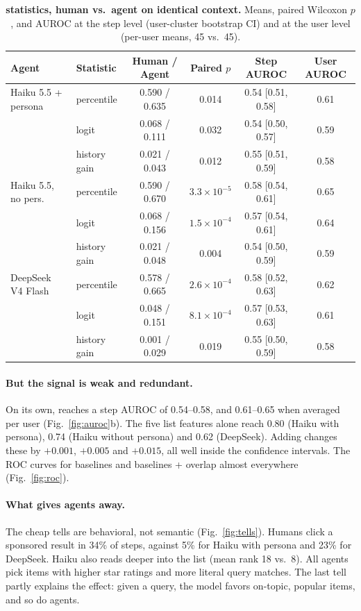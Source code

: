 \begin{table}[t]
\centering
\small
\caption{\textbf{\bgpt{} statistics, human vs.\ agent on identical context.} Means, paired Wilcoxon $p$, and AUROC at the step level (user-cluster bootstrap CI) and at the user level (per-user means, 45 vs.\ 45).}
\label{tab:main}
\setlength{\tabcolsep}{3.5pt}
\begin{tabular}{llcccc}
\toprule
Agent & Statistic & Human / Agent & Paired $p$ & Step AUROC & User AUROC \\
\midrule
Haiku 5.5 + persona & percentile & 0.590 / 0.635 & 0.014 & 0.54 [0.51, 0.58] & 0.61 \\
 & logit & 0.068 / 0.111 & 0.032 & 0.54 [0.50, 0.57] & 0.59 \\
 & history gain & 0.021 / 0.043 & 0.012 & 0.55 [0.51, 0.59] & 0.58 \\
\addlinespace
Haiku 5.5, no pers.\ & percentile & 0.590 / 0.670 & $3.3\times10^{-5}$ & 0.58 [0.54, 0.61] & 0.65 \\
 & logit & 0.068 / 0.156 & $1.5\times10^{-4}$ & 0.57 [0.54, 0.61] & 0.64 \\
 & history gain & 0.021 / 0.048 & 0.004 & 0.54 [0.50, 0.59] & 0.59 \\
\addlinespace
DeepSeek V4 Flash & percentile & 0.578 / 0.665 & $2.6\times10^{-4}$ & 0.58 [0.52, 0.63] & 0.62 \\
 & logit & 0.048 / 0.151 & $8.1\times10^{-4}$ & 0.57 [0.53, 0.63] & 0.61 \\
 & history gain & 0.001 / 0.029 & 0.019 & 0.55 [0.50, 0.59] & 0.58 \\
\bottomrule
\end{tabular}
\end{table}

\paragraph{But the signal is weak and redundant.} On its own, \bgpt{} reaches a step AUROC of 0.54--0.58, and 0.61--0.65 when averaged per user (Fig.~\ref{fig:auroc}b). The five list features alone reach 0.80 (Haiku with persona), 0.74 (Haiku without persona) and 0.62 (DeepSeek). Adding \bgpt{} changes these by $+0.001$, $+0.005$ and $+0.015$, all well inside the confidence intervals. The ROC curves for baselines and baselines + \bgpt{} overlap almost everywhere (Fig.~\ref{fig:roc}).

\paragraph{What gives agents away.} The cheap tells are behavioral, not semantic (Fig.~\ref{fig:tells}). Humans click a sponsored result in 34\% of steps, against 5\% for Haiku with persona and 23\% for DeepSeek. Haiku also reads deeper into the list (mean rank 18 vs.\ 8). All agents pick items with higher star ratings and more literal query matches. The last tell partly explains the \bgpt{} effect: given a query, the model favors on-topic, popular items, and so do agents.

